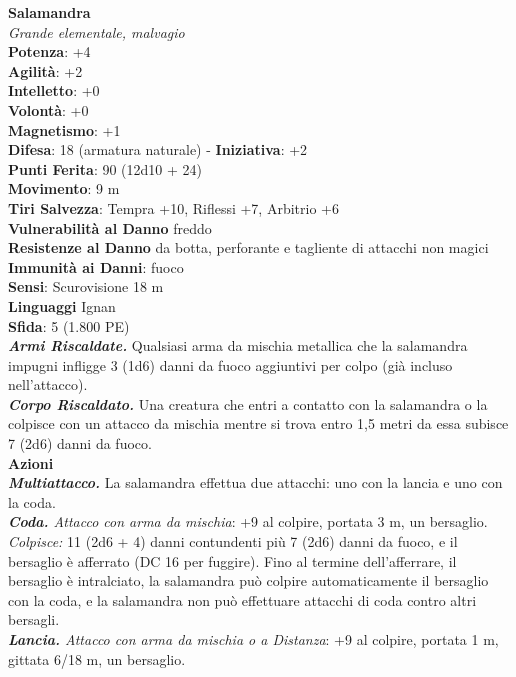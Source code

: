\begin{multicols}{2}
\medskip\textbf{Salamandra}\\
\emph{Grande elementale, malvagio}\\
\textbf{Potenza}: +4\\
\textbf{Agilità}: +2\\
\textbf{Intelletto}: +0\\
\textbf{Volontà}: +0\\
\textbf{Magnetismo}: +1\\
\textbf{Difesa}: 18 (armatura naturale) - \textbf{Iniziativa}: +2\\
\textbf{Punti Ferita}: 90 (12d10 + 24)\\
\textbf{Movimento}: 9 m\\
\textbf{Tiri Salvezza}: Tempra +10, Riflessi +7, Arbitrio +6\\
\textbf{Vulnerabilità al Danno} freddo\\
\textbf{Resistenze al Danno} da botta, perforante e tagliente di attacchi non magici\\
\textbf{Immunità ai Danni}: fuoco\\
\textbf{Sensi}: Scurovisione 18 m\\
\textbf{Linguaggi} Ignan\\
\textbf{Sfida}: 5 (1.800 PE)\smallskip\\
\emph{\textbf{Armi Riscaldate.}} Qualsiasi arma da mischia metallica che la salamandra impugni infligge 3 (1d6) danni da fuoco aggiuntivi per colpo (già incluso nell'attacco).\\
\emph{\textbf{Corpo Riscaldato.}} Una creatura che entri a contatto con la salamandra o la colpisce con un attacco da mischia mentre si trova entro 1,5 metri da essa subisce 7 (2d6) danni da fuoco.\\
\smallskip\textbf{Azioni}\\
\emph{\textbf{Multiattacco.}} La salamandra effettua due attacchi: uno con la lancia e uno con la coda.\\
\emph{\textbf{Coda.} Attacco con arma da mischia}: +9 al colpire, portata 3 m, un bersaglio.\\
\emph{Colpisce:} 11 (2d6 + 4) danni contundenti più 7 (2d6) danni da fuoco, e il bersaglio è afferrato (DC  16 per fuggire). Fino al termine dell'afferrare, il bersaglio è intralciato, la salamandra può colpire automaticamente il bersaglio con la coda, e la salamandra non può effettuare attacchi di coda contro altri bersagli.\\
\emph{\textbf{Lancia.} Attacco con arma da mischia o a Distanza}: +9 al colpire, portata 1 m, gittata 6/18 m, un bersaglio.\\

\end{multicols}
